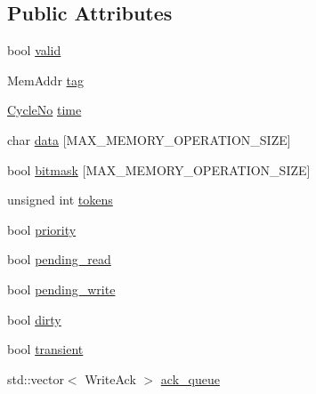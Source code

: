\subsection*{Public Attributes}
\begin{DoxyCompactItemize}
\item 
bool \hyperlink{struct_simulator_1_1_z_l_c_d_m_a_1_1_cache_1_1_line_a1e5aadfd264aca5367477990c9715df0}{valid}
\item 
Mem\+Addr \hyperlink{struct_simulator_1_1_z_l_c_d_m_a_1_1_cache_1_1_line_a068e50558cae8d519e81520052a6ef6b}{tag}
\item 
\hyperlink{namespace_simulator_a928f1e2101eba21bb0fe409e8c9ce573}{Cycle\+No} \hyperlink{struct_simulator_1_1_z_l_c_d_m_a_1_1_cache_1_1_line_a88c32ddd3b3419d9aa47e42449a07380}{time}
\item 
char \hyperlink{struct_simulator_1_1_z_l_c_d_m_a_1_1_cache_1_1_line_ab040f4086be57f0beae169767d330a30}{data} \mbox{[}M\+A\+X\+\_\+\+M\+E\+M\+O\+R\+Y\+\_\+\+O\+P\+E\+R\+A\+T\+I\+O\+N\+\_\+\+S\+I\+Z\+E\mbox{]}
\item 
bool \hyperlink{struct_simulator_1_1_z_l_c_d_m_a_1_1_cache_1_1_line_a45a8608b6f992c6da5cb1dbe50a567aa}{bitmask} \mbox{[}M\+A\+X\+\_\+\+M\+E\+M\+O\+R\+Y\+\_\+\+O\+P\+E\+R\+A\+T\+I\+O\+N\+\_\+\+S\+I\+Z\+E\mbox{]}
\item 
unsigned int \hyperlink{struct_simulator_1_1_z_l_c_d_m_a_1_1_cache_1_1_line_a7b9733ab4e44bc13a88597c991456611}{tokens}
\item 
bool \hyperlink{struct_simulator_1_1_z_l_c_d_m_a_1_1_cache_1_1_line_a536b5bb6f1f4316adf4f6bb4f0a09004}{priority}
\item 
bool \hyperlink{struct_simulator_1_1_z_l_c_d_m_a_1_1_cache_1_1_line_acf517b17340e90e3672e958870c15bdf}{pending\+\_\+read}
\item 
bool \hyperlink{struct_simulator_1_1_z_l_c_d_m_a_1_1_cache_1_1_line_a2e8b95a6c91266d2597798b14107e21a}{pending\+\_\+write}
\item 
bool \hyperlink{struct_simulator_1_1_z_l_c_d_m_a_1_1_cache_1_1_line_a40f15d87c51554ddec4b1a756f979f0b}{dirty}
\item 
bool \hyperlink{struct_simulator_1_1_z_l_c_d_m_a_1_1_cache_1_1_line_a5551a4b3d3109569b4c49cea032c55d9}{transient}
\item 
std\+::vector$<$ Write\+Ack $>$ \hyperlink{struct_simulator_1_1_z_l_c_d_m_a_1_1_cache_1_1_line_aa840eed81b2ffc0ac3fe7027babe6672}{ack\+\_\+queue}
\end{DoxyCompactItemize}


